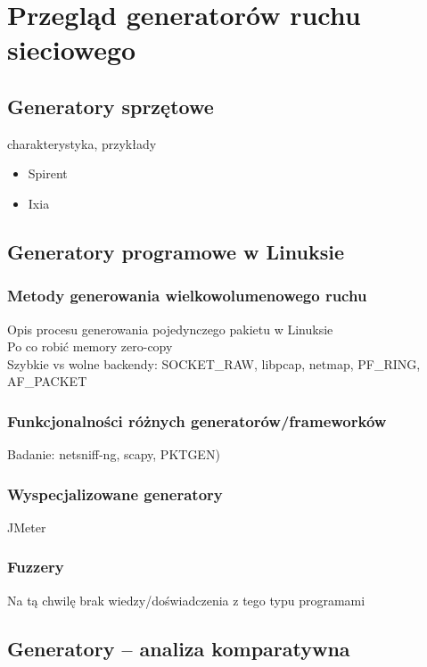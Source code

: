 \chapter{Przegląd generatorów ruchu sieciowego}
\section{Generatory sprzętowe}

charakterystyka, przykłady
\begin{itemize}
\item Spirent
\item Ixia
\end{itemize}





\section{Generatory programowe w Linuksie}

\subsection{Metody generowania wielkowolumenowego ruchu}

Opis procesu generowania pojedynczego pakietu w Linuksie \\
Po co robić memory zero-copy \\
Szybkie vs wolne backendy: SOCKET\_RAW, libpcap, netmap, PF\_RING, AF\_PACKET \\

\subsection{Funkcjonalności różnych generatorów/frameworków}
Badanie: netsniff-ng, scapy, PKTGEN)

\subsection{Wyspecjalizowane generatory}
 JMeter
\subsection{Fuzzery}

Na tą chwilę brak wiedzy/doświadczenia z tego typu programami




\section{Generatory – analiza komparatywna}

